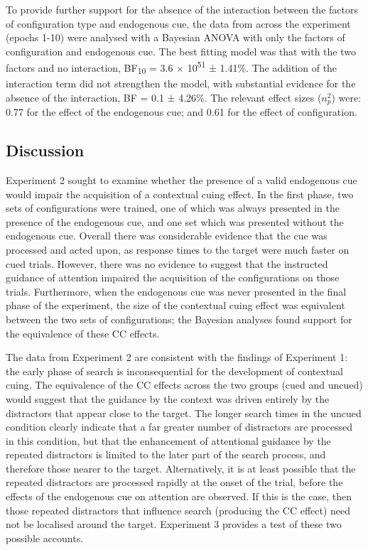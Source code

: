 \documentclass[
  man,
  floatsintext,
  longtable,
  nolmodern,
  notxfonts,
  notimes,
  colorlinks=true,linkcolor=blue,citecolor=blue,urlcolor=blue]{apa7}
\begin{document}
To provide further support for the absence of the interaction between
the factors of configuration type and endogenous cue, the data from
across the experiment (epochs 1-10) were analysed with a Bayesian ANOVA
with only the factors of configuration and endogenous cue. The best
fitting model was that with the two factors and no interaction,
BF\textsubscript{10} = 3.6 × 10\textsuperscript{51} ± 1.41\%. The
addition of the interaction term did not strengthen the model, with
substantial evidence for the absence of the interaction, BF = 0.1 ±
4.26\%. The relevant effect sizes (\(n^2_p\)) were: 0.77 for the effect
of the endogenous cue; and 0.61 for the effect of configuration.

\subsection{Discussion}\label{discussion-1}

Experiment 2 sought to examine whether the presence of a valid
endogenous cue would impair the acquisition of a contextual cuing
effect. In the first phase, two sets of configurations were trained, one
of which was always presented in the presence of the endogenous cue, and
one set which was presented without the endogenous cue. Overall there
was considerable evidence that the cue was processed and acted upon, as
response times to the target were much faster on cued trials. However,
there was no evidence to suggest that the instructed guidance of
attention impaired the acquisition of the configurations on those
trials. Furthermore, when the endogenous cue was never presented in the
final phase of the experiment, the size of the contextual cuing effect
was equivalent between the two sets of configurations; the Bayesian
analyses found support for the equivalence of these CC effects.

The data from Experiment 2 are consistent with the findings of
Experiment 1: the early phase of search is inconsequential for the
development of contextual cuing. The equivalence of the CC effects
across the two groups (cued and uncued) would suggest that the guidance
by the context was driven entirely by the distractors that appear close
to the target. The longer search times in the uncued condition clearly
indicate that a far greater number of distractors are processed in this
condition, but that the enhancement of attentional guidance by the
repeated distractors is limited to the later part of the search process,
and therefore those nearer to the target. Alternatively, it is at least
possible that the repeated distractors are processed rapidly at the
onset of the trial, before the effects of the endogenous cue on
attention are observed. If this is the case, then those repeated
distractors that influence search (producing the CC effect) need not be
localised around the target. Experiment 3 provides a test of these two
possible accounts.
\end{document}
